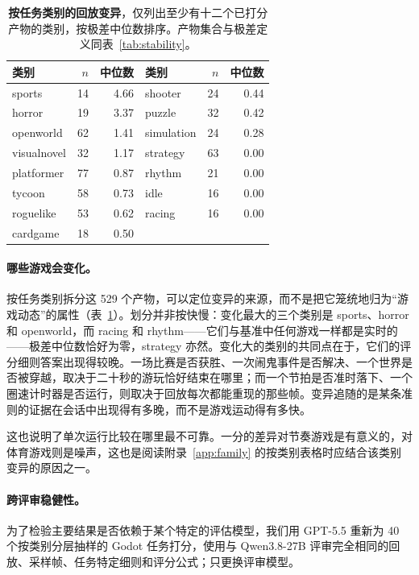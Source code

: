 \begin{table}[htbp]
\caption{\textbf{按任务类别的回放变异}，仅列出至少有十二个已打分产物的类别，按极差中位数排序。产物集合与极差定义同表~\ref{tab:stability}。}
\label{tab:family-var}
\centering\small
\begin{tabular}{@{}lrr@{\hspace{3em}}lrr@{}}
\toprule
类别 & $n$ & 中位数 & 类别 & $n$ & 中位数 \\
\midrule
sports & 14 & 4.66 & shooter & 24 & 0.44 \\
horror & 19 & 3.37 & puzzle & 32 & 0.42 \\
openworld & 62 & 1.41 & simulation & 24 & 0.28 \\
visualnovel & 32 & 1.17 & strategy & 63 & 0.00 \\
platformer & 77 & 0.87 & rhythm & 21 & 0.00 \\
tycoon & 58 & 0.73 & idle & 16 & 0.00 \\
roguelike & 53 & 0.62 & racing & 16 & 0.00 \\
cardgame & 18 & 0.50 & & & \\
\bottomrule
\end{tabular}
\end{table}

\paragraph{哪些游戏会变化。}按任务类别拆分这 529 个产物，可以定位变异的来源，而不是把它笼统地归为“游戏动态”的属性（表~\ref{tab:family-var}）。划分并非按快慢：变化最大的三个类别是 sports、horror 和 openworld，而 racing 和 rhythm——它们与基准中任何游戏一样都是实时的——极差中位数恰好为零，strategy 亦然。变化大的类别的共同点在于，它们的评分细则答案出现得较晚。一场比赛是否获胜、一次闹鬼事件是否解决、一个世界是否被穿越，取决于二十秒的游玩恰好结束在哪里；而一个节拍是否准时落下、一个圈速计时器是否运行，则取决于回放每次都能重现的那些帧。变异追随的是某条准则的证据在会话中出现得有多晚，而不是游戏运动得有多快。

这也说明了单次运行比较在哪里最不可靠。一分的差异对节奏游戏是有意义的，对体育游戏则是噪声，这也是阅读附录~\ref{app:family} 的按类别表格时应结合该类别变异的原因之一。

\paragraph{跨评审稳健性。}为了检验主要结果是否依赖于某个特定的评估模型，我们用 GPT-5.5 重新为 40 个按类别分层抽样的 Godot 任务打分，使用与 Qwen3.8-27B 评审完全相同的回放、采样帧、任务特定细则和评分公式；只更换评审模型。

